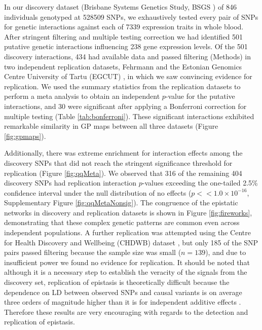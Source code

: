 \documentclass{article}
\begin{document}
In our discovery dataset (Brisbane Systems Genetics Study, BSGS \cite{Powell2012}) of 846 individuals genotyped at 528509 SNPs, we exhaustively tested every pair of SNPs for genetic interactions against each of 7339 expression traits in whole blood. After stringent filtering and multiple testing correction we had identified 501 putative genetic interactions influencing 238 gene expression levels. Of the 501 discovery interactions, 434 had available data and passed filtering (Methods) in two independent replication datasets, Fehrmann \cite{Fehrmann2011} and the Estonian Genomics Centre University of Tartu (EGCUT) \cite{Metspalu2004}, in which we saw convincing evidence for replication. We used the summary statistics from the replication datasets to perform a meta analysis to obtain an independent $p$-value for the putative interactions, and 30 were significant after applying a Bonferroni correction for multiple testing (Table \ref{tab:bonferroni}). These significant interactions exhibited remarkable similarity in GP maps between all three datasets (Figure \ref{fig:gpmaps}).

Additionally, there was extreme enrichment for interaction effects among the discovery SNPs that did not reach the stringent significance threshold for replication (Figure \ref{fig:qqMeta}). We observed that 316 of the remaining 404 discovery SNPs had replication interaction $p$-values exceeding the one-tailed 2.5\% confidence interval under the null distribution of no effects ($p << 1.0 \times 10^{-16}$, Supplementary Figure \ref{fig:qqMetaNonsig}). The congruence of the epistatic networks in discovery and replication datasets is shown in Figure \ref{fig:fireworks}, demonstrating that these complex genetic patterns are common even across independent populations. A further replication was attempted using the Centre for Health Discovery and Wellbeing (CHDWB) dataset \cite{Preininger2013}, but only 185 of the SNP pairs passed filtering because the sample size was small ($n=139$), and due to insufficient power we found no evidence for replication. It should be noted that although it is a necessary step to establish the veracity of the signals from the discovery set, replication of epistasis is theoretically difficult because the dependence on LD between observed SNPs and causal variants is on average three orders of magnitude higher than it is for independent additive effects \cite{Weir2008, Hemani2013}. Therefore these results are very encouraging with regards to the detection and replication of epistasis.
\end{document}

